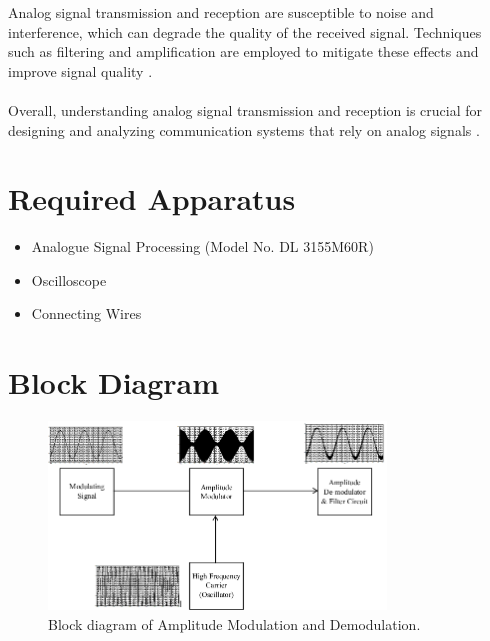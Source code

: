 \documentclass[12pt]{article}
\begin{document}
Analog signal transmission and reception are susceptible to noise and interference, which can degrade the quality of the received signal. Techniques such as filtering and amplification are employed to mitigate these effects and improve signal quality \cite{haykin2001communication}.
\\\\
Overall, understanding analog signal transmission and reception is crucial for designing and analyzing communication systems that rely on analog signals \cite{proakis2007digital}.

\section*{Required Apparatus}
\begin{itemize}
    \item  Analogue Signal Processing (Model No. DL 3155M60R)
    \item Oscilloscope
    \item Connecting Wires
\end{itemize}

\section*{Block Diagram}
\begin{figure}[H]
    \centering
    \includegraphics[width=0.8\textwidth]{blck.png}
    \caption{Block diagram of Amplitude Modulation and Demodulation.\cite{blck}}
    \label{fig:block_diagram}
\end{figure}
\end{document}
